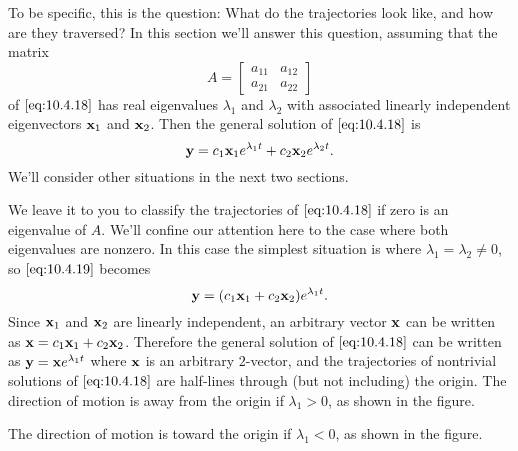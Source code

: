 \documentclass{ximera}
\begin{document}
To be specific, this is the question: What do the trajectories look
like, and how are they traversed? In this section we'll answer this
question, assuming that the matrix
$$
A=\begin{bmatrix}a_{11}&a_{12}\\a_{21}&a_{22}
\end{bmatrix}
$$
of $\eqref{eq:10.4.18}$ has real eigenvalues $\lambda_1$ and $\lambda_2$ with
associated linearly independent eigenvectors ${\bf x}_1$ and ${\bf
x}_2$. Then  the general solution of $\eqref{eq:10.4.18}$ is
\begin{equation} \label{eq:10.4.19}
{\bf y}= c_1{\bf x}_1
 e^{\lambda_1 t}+c_2{\bf x}_2e^{\lambda_2 t}.
\end{equation}
We'll consider other situations in the next two sections.

We leave it to you %
to classify the
trajectories of $\eqref{eq:10.4.18}$ if zero is an eigenvalue of $A$. We'll
confine our attention here to the case where both eigenvalues are
nonzero. In this case the simplest situation is where
$\lambda_1=\lambda_2\neq 0$, so  $\eqref{eq:10.4.19}$ becomes
$$
{\bf y}=(c_1{\bf x}_1+c_2{\bf x}_2)e^{\lambda_1 t}.
$$
Since ${\bf x}_1$ and
${\bf x}_2$ are linearly independent, an arbitrary vector ${\bf x}$
can be written as ${\bf x}=c_1{\bf x}_1+c_2{\bf x}_2$. Therefore the
general solution of $\eqref{eq:10.4.18}$ can be written as ${\bf y}={\bf
x}e^{\lambda_1 t}$ where ${\bf x}$ is an arbitrary $2$-vector, and the
trajectories of nontrivial solutions of $\eqref{eq:10.4.18}$ are half-lines
through (but not including) the origin. The direction of motion is
away from the origin if $\lambda_1>0$, as shown in the figure.

\begin{center}
\end{center}



The direction of motion is toward the origin if $\lambda_1<0$, as shown in the figure. 

\begin{center}
\end{center}
\end{document}
